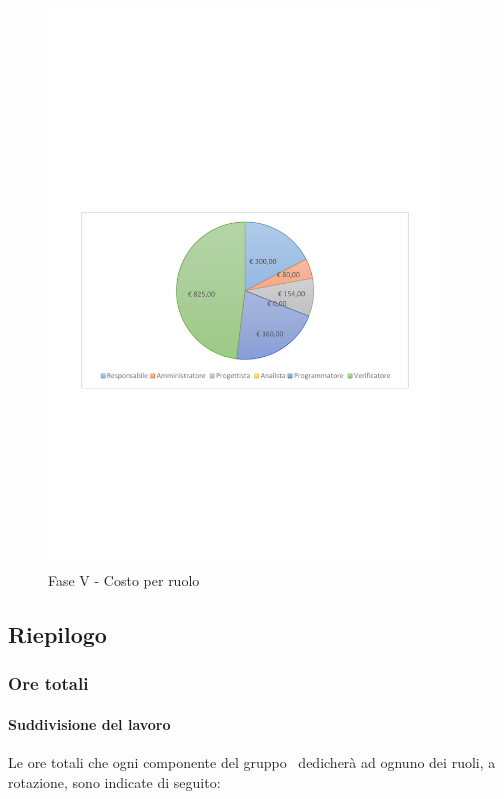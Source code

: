 \documentclass[../PianoProgetto.tex]{subfiles}
\begin{document}
	\begin{figure}[!h]
		\centering
		\includegraphics[width=0.93\textwidth , trim=2cm 9.5cm 2cm 11cm]{grafici/V/V-costo}
			\caption{Fase V - Costo per ruolo}
		\label{fig:CircleChart-faseV_costo}
	\end{figure}	
	
	\subsection{Riepilogo}
			\subsubsection{Ore totali}
				\paragraph{Suddivisione del lavoro}
					Le ore totali che ogni componente del gruppo \leaf\ dedicherà ad ognuno dei ruoli, a rotazione, sono indicate di seguito:
	
\end{document}
